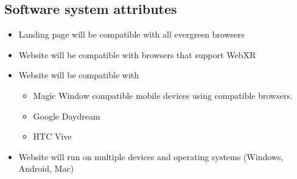 \subsection{Software system attributes}
\begin{itemize}
    \item Landing page will be compatible with all evergreen browsers
    \item Website will be compatible with browsers that support WebXR
    \item Website will be compatible with
    \begin{itemize}
        \item Magic Window compatible mobile devices using compatible browsers.
        \item Google Daydream
        \item HTC Vive
    \end{itemize}
    \item Website will run on multiple devices and operating systems (Windows, Android, Mac)
\end{itemize}